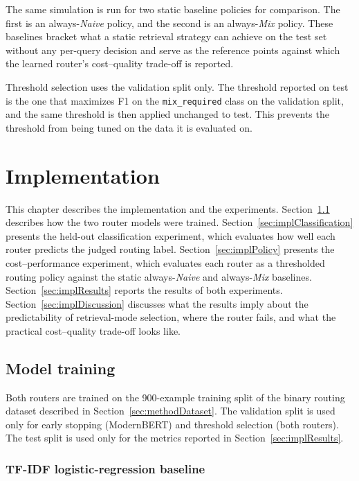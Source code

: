 \documentclass[english, bibtex]{kththesis}               %
\numberwithin{listing}{chapter}
\begin{document}
The same simulation is run for two static baseline policies for comparison. The first is an always-\emph{Naive} policy, and the second is an always-\emph{Mix} policy. These baselines bracket what a static retrieval strategy can achieve on the test set without any per-query decision and serve as the reference points against which the learned router's cost--quality trade-off is reported.

Threshold selection uses the validation split only. The threshold reported on test is the one that maximizes F1 on the \texttt{mix\_required} class on the validation split, and the same threshold is then applied unchanged to test. This prevents the threshold from being tuned on the data it is evaluated on.

\cleardoublepage
\chapter{Implementation}
\label{ch:implementation}

This chapter describes the implementation and the experiments. Section~\ref{sec:implTraining} describes how the two router models were trained. Section~\ref{sec:implClassification} presents the held-out classification experiment, which evaluates how well each router predicts the judged routing label. Section~\ref{sec:implPolicy} presents the cost--performance experiment, which evaluates each router as a thresholded routing policy against the static always-\emph{Naive} and always-\emph{Mix} baselines. Section~\ref{sec:implResults} reports the results of both experiments. Section~\ref{sec:implDiscussion} discusses what the results imply about the predictability of retrieval-mode selection, where the router fails, and what the practical cost--quality trade-off looks like.

\section{Model training}
\label{sec:implTraining}

Both routers are trained on the 900-example training split of the binary routing dataset described in Section~\ref{sec:methodDataset}. The validation split is used only for early stopping (ModernBERT) and threshold selection (both routers). The test split is used only for the metrics reported in Section~\ref{sec:implResults}.

\subsection{TF-IDF logistic-regression baseline}
\label{sec:implTfidf}
\end{document}

